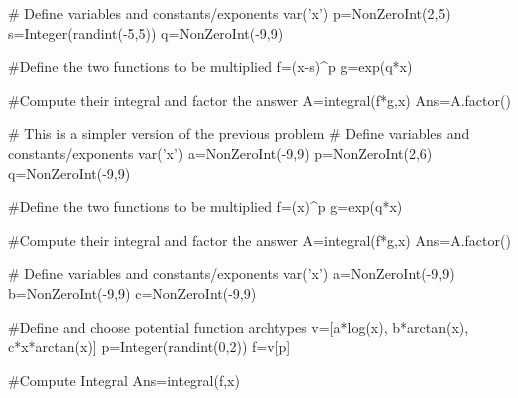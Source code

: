 

\begin{sagesilent}
# Define variables and constants/exponents
var('x')
p=NonZeroInt(2,5)
s=Integer(randint(-5,5))
q=NonZeroInt(-9,9)

#Define the two functions to be multiplied
f=(x-s)^p
g=exp(q*x)

#Compute their integral and factor the answer
A=integral(f*g,x)
Ans=A.factor()
\end{sagesilent}



\begin{sagesilent}
# This is a simpler version of the previous problem
# Define variables and constants/exponents
var('x')
a=NonZeroInt(-9,9)
p=NonZeroInt(2,6)
q=NonZeroInt(-9,9)

#Define the two functions to be multiplied
f=(x)^p
g=exp(q*x)

#Compute their integral and factor the answer
A=integral(f*g,x)
Ans=A.factor()
\end{sagesilent}



\begin{sagesilent}
# Define variables and constants/exponents
var('x')
a=NonZeroInt(-9,9)
b=NonZeroInt(-9,9)
c=NonZeroInt(-9,9)

#Define and choose potential function archtypes
v=[a*log(x), b*arctan(x), c*x*arctan(x)]
p=Integer(randint(0,2))
f=v[p]

#Compute Integral
Ans=integral(f,x)
\end{sagesilent}

